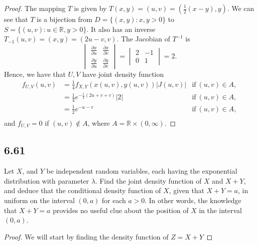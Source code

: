 \documentclass{article}
\newcommand{\R}{\mathbb{R}}
\newcommand{\partiald}[2]{\frac{\partial #1}{\partial #2}}
\begin{document}
\begin{proof}
    The mapping $T$ is given by $T(x,y) = (u,v) = (\frac{1}{2}(x-y), y)$. We can
    see that $T$ is a bijection from $D=\{(x,y): x,y > 0\}$ to
    ${S = \{(u,v): u \in \R, y>0\}}$. It also has an inverse
    $T_{-1}(u,v) = (x,y) = (2u-v, v)$. The Jacobian of $T^{-1}$ is
    \begin{equation*}
        \begin{vmatrix}
            \partiald{x}{u} & \partiald{x}{v} \\
            \partiald{y}{u} & \partiald{y}{v}
        \end{vmatrix} =
        \begin{vmatrix}
            2 & -1 \\
            0 & 1
        \end{vmatrix} = 2.
    \end{equation*}
    Hence, we have that $U,V$ have joint density function
    \begin{align*}
        f_{U,V}(u,v) & = \frac{1}{4}f_{X,Y}(x(u,v),y(u,v))|J(u,v)|
                     & \text{if} \ (u,v) \in A,                    \\
                     & = \frac{1}{4}e^{-\frac{1}{2}(2u+v+v)}|2|
                     & \text{if} \ (u,v) \in A,                    \\
                     & = \frac{1}{2}e^{-u-v}
                     & \text{if} \ (u,v) \in A,                    \\
    \end{align*}
    and $f_{U,V} = 0$ if $(u,v) \not \in A$, where $A = \R \times (0,\infty)$.
\end{proof}

\subsection*{6.61}
Let $X$, and $Y$ be independent random variables, each having the exponential
distribution with parameter $\lambda$. Find the joint density function of
$X$ and $X+Y$, and deduce that the conditional density function of $X$,
given that $X+Y=a$, in uniform on the interval $(0,a)$ for each $a>0$.
In other words, the knowledge that $X+Y = a$ provides no useful clue
about the position of $X$ in the interval $(0,a)$.

\begin{proof}
    We will start by finding the density function of $Z=X+Y$
\end{proof}
\end{document}
